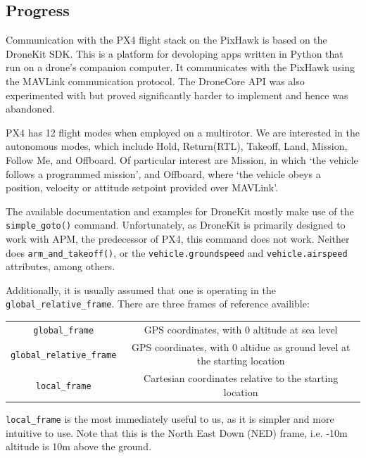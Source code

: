 \documentclass[10pt]{article}
\begin{document}
\subsection{Progress}
Communication with the PX4 flight stack on the PixHawk is based on the DroneKit SDK. This is a platform for devoloping apps written in Python that run on a drone's companion computer. It communicates with the PixHawk using the MAVLink communication protocol.\cite{dronekit} The DroneCore API was also experimented with but proved significantly harder to implement and hence was abandoned.

PX4 has 12 flight modes when employed on a multirotor. We are interested in the autonomous modes, which include Hold, Return(RTL), Takeoff, Land, Mission, Follow Me, and Offboard. Of particular interest are Mission, in which `the vehicle follows a programmed mission', and Offboard, where `the vehicle obeys a position, velocity or attitude setpoint provided over MAVLink'.\cite{PX4_user_guide}

The available documentation and examples for DroneKit mostly make use of the \lstinline[language=Python]|simple_goto()| command. Unfortunately, as DroneKit is primarily designed to work with APM, the predecessor of PX4, this command does not work. Neither does \lstinline[language=Python]|arm_and_takeoff()|, or the \lstinline|vehicle.groundspeed| and \lstinline|vehicle.airspeed| attributes, among others.

Additionally, it is usually assumed that one is operating in the \lstinline|global_relative_frame|. There are three frames of reference availible:
\begin{center}
\begin{tabular}{cc}
    \lstinline|global_frame| & GPS coordinates, with 0 altitude at sea level \\
    \lstinline|global_relative_frame| & GPS coordinates, with 0 altidue as ground level at the starting location \\
    \lstinline|local_frame| & Cartesian coordinates relative to the starting location
\end{tabular}
\end{center}
\lstinline|local_frame| is the most immediately useful to us, as it is simpler and more intuitive to use. Note that this is the North East Down (NED) frame, i.e. -10m altitude is 10m above the ground.
\end{document}
